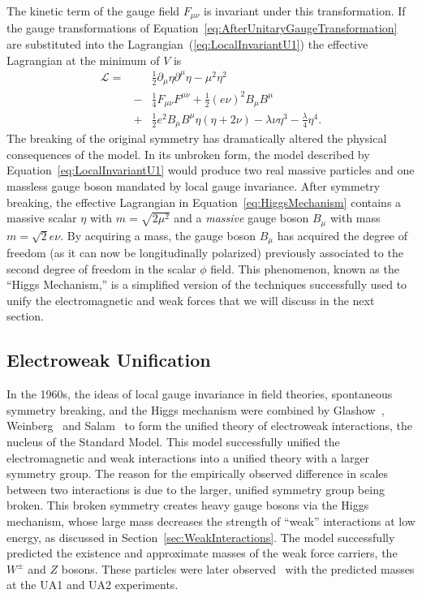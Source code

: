 The kinetic term of the gauge field $F_{\mu\nu}$ is invariant under this
transformation.  If the gauge transformations of
Equation~\ref{eq:AfterUnitaryGaugeTransformation} are substituted into the
Lagrangian~(\ref{eq:LocalInvariantU1}) the effective Lagrangian at the minimum
of $V$ is
\begin{eqnarray}
  \mathcal{L} =& & \frac{1}{2} \partial_\mu \eta \partial^\mu \eta -
  \mu^2 \eta^2  \nonumber \\
  &-& \frac{1}{4} F_{\mu\nu} F^{\mu\nu} + \frac{1}{2} (e\nu)^2 B_\mu B^\mu
  \nonumber \\
  &+& \frac{1}{2} e^2 B_\mu B^\mu \eta (\eta + 2 \nu) - \lambda \nu \eta^3 -
  \frac{\lambda }{4}\eta^4.
  \label{eq:HiggsMechanism}
\end{eqnarray}
The breaking of the original symmetry has dramatically altered the physical
consequences of the model.  In its unbroken form, the model described by
Equation~\ref{eq:LocalInvariantU1} would produce two real massive particles and
one massless gauge boson mandated by local gauge invariance.  After symmetry
breaking, the effective Lagrangian in Equation~\ref{eq:HiggsMechanism} contains
a massive scalar $\eta$ with $m = \sqrt{2\mu^2}$ and a \emph{massive} gauge
boson $B_\mu$ with mass $m = \sqrt 2 e\nu$.  By acquiring a mass, the gauge
boson $B_\mu$ has acquired the degree of freedom (as it can now be
longitudinally polarized) previously associated to the second degree of freedom
in the scalar $\phi$ field.  This phenomenon, known as the ``Higgs Mechanism,''
is a simplified version of the techniques successfully used to unify the
electromagnetic and weak forces that we will discuss in the next section.  

\subsection{Electroweak Unification}
\label{sec:ElectroweakUnification} In the 1960s, the ideas of local gauge
invariance in field theories, spontaneous symmetry breaking, and the Higgs
mechanism were combined by Glashow~\cite{Glashow:1961tr},
Weinberg~\cite{Weinberg:1967tq} and Salam~\cite{Salam:1968rm} to form the
unified theory of electroweak interactions, the nucleus of the Standard Model.
This model successfully unified the electromagnetic and weak interactions into a
unified theory with a larger symmetry group.  The reason for the empirically
observed difference in scales between two interactions is due to the larger,
unified symmetry group being broken.  This broken symmetry creates heavy gauge
bosons via the Higgs mechanism, whose large mass decreases the strength of
``weak'' interactions at low energy, as discussed in
Section~\ref{sec:WeakInteractions}.  The model successfully predicted the
existence and approximate masses of the weak force carriers, the $W^\pm$ and $Z$
bosons.  These particles were later
observed~\cite{UA1WDiscovery,UA2WDiscovery,UA1ZDiscovery,UA2ZDiscovery} with the
predicted masses at the UA1 and UA2 experiments. 

